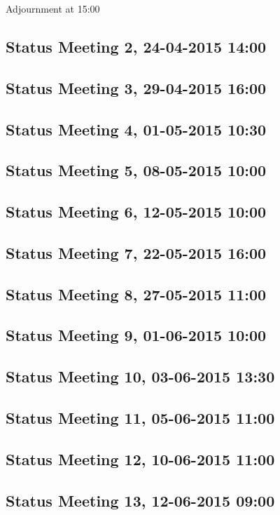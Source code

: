 Adjournment at 15:00

\subsection{Status Meeting 2, 24-04-2015 14:00}


\subsection{Status Meeting 3, 29-04-2015 16:00}


\subsection{Status Meeting 4, 01-05-2015 10:30}


\subsection{Status Meeting 5, 08-05-2015 10:00}


\subsection{Status Meeting 6, 12-05-2015 10:00}


\subsection{Status Meeting 7, 22-05-2015 16:00}


\subsection{Status Meeting 8, 27-05-2015 11:00}


\subsection{Status Meeting 9, 01-06-2015 10:00}


\subsection{Status Meeting 10, 03-06-2015 13:30}


\subsection{Status Meeting 11, 05-06-2015 11:00}


\subsection{Status Meeting 12, 10-06-2015 11:00}


\subsection{Status Meeting 13, 12-06-2015 09:00}

